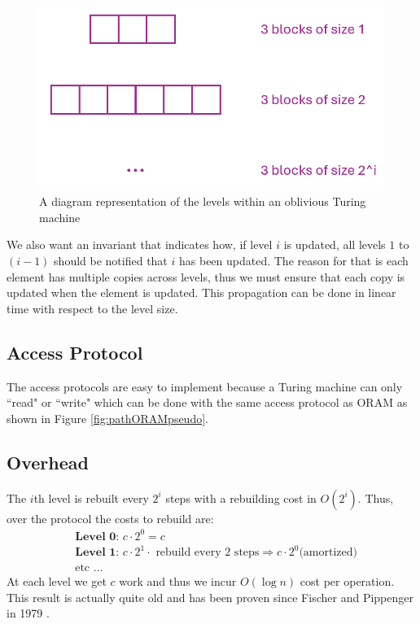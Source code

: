 \documentclass[11pt]{article}
\begin{document}
\begin{figure}
    \centering
    \includegraphics[scale=0.8]{blocks.png}
    \caption{A diagram representation of the levels within an oblivious Turing machine}
    \label{fig:turing_blocks}
\end{figure}

We also want an invariant that indicates how, if level $i$ is updated, all levels $1$ to $(i-1)$ should be notified that $i$ has been updated. The reason for that is each element has multiple copies across levels, thus we must ensure that each copy is updated when the element is updated. This propagation can be done in linear time with respect to the level size.

\subsection{Access Protocol}
The access protocols are easy to implement because a Turing machine can only ``read" or ``write" which can be done with the same access protocol as ORAM as shown in Figure \ref{fig:pathORAMpseudo}.

\subsection{Overhead}
The $i$th level is rebuilt every $2^i$ steps with a rebuilding cost in $O(2^i)$. Thus, over the protocol the costs to rebuild are:
\begin{align*}
    &\textbf{Level 0: } c \cdot 2^0 = c \\
    &\textbf{Level 1: } c \cdot 2^1\cdot \text{ rebuild every 2 steps} \Rightarrow c \cdot 2^0 \text{(amortized)} \tag{Rebuild cost is linear}\\
    &\text{etc } \dots
\end{align*}
At each level we get $c$ work and thus we incur $O(\log n)$ cost per operation. This result is actually quite old and has been proven since Fischer and Pippenger in 1979 \cite{pippenger1979relations}.

\newpage


\end{document}

